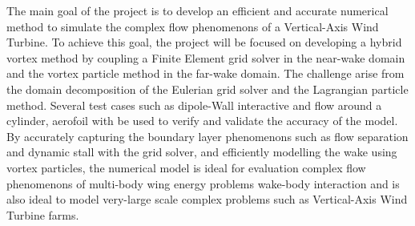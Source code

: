 %

The main goal of the project is to develop an efficient and accurate numerical method to simulate the complex flow phenomenons of a Vertical-Axis Wind Turbine. To achieve this goal, the project will be focused on developing a hybrid vortex method by coupling a Finite Element grid solver in the near-wake domain and the vortex particle method in the far-wake domain. The challenge arise from the domain decomposition of the Eulerian grid solver and the Lagrangian particle method. Several test cases such as dipole-Wall interactive and flow around a cylinder, aerofoil with be used to verify and validate the accuracy of the model. By accurately capturing the boundary layer phenomenons such as flow separation and dynamic stall with the grid solver, and efficiently modelling the wake using vortex particles, the numerical model is ideal for evaluation complex flow phenomenons of multi-body wing energy problems wake-body interaction and is also ideal to model very-large scale complex problems such as Vertical-Axis Wind Turbine farms.


